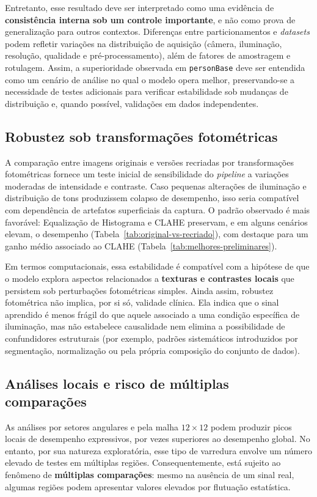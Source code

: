 \documentclass[12pt,a4paper]{article}
\begin{document}
Entretanto, esse resultado deve ser interpretado como uma evidência de
\textbf{consistência interna sob um controle importante}, e não como prova de
generalização para outros contextos. Diferenças entre particionamentos e
\textit{datasets} podem refletir variações na distribuição de aquisição (câmera,
iluminação, resolução, qualidade e pré-processamento), além de fatores de
amostragem e rotulagem. Assim, a superioridade observada em \texttt{personBase}
deve ser entendida como um cenário de análise no qual o modelo opera melhor,
preservando-se a necessidade de testes adicionais para verificar estabilidade
sob mudanças de distribuição e, quando possível, validações em dados independentes.

\subsection{Robustez sob transformações fotométricas}
A comparação entre imagens originais e versões recriadas por transformações
fotométricas fornece um teste inicial de sensibilidade do \textit{pipeline} a
variações moderadas de intensidade e contraste. Caso pequenas alterações de
iluminação e distribuição de tons produzissem colapso de desempenho, isso seria
compatível com dependência de artefatos superficiais da captura. O padrão
observado é mais favorável: Equalização de Histograma e CLAHE preservam, e em
alguns cenários elevam, o desempenho (Tabela~\ref{tab:original-vs-recriado}),
com destaque para um ganho médio associado ao CLAHE
(Tabela~\ref{tab:melhores-preliminares}).

Em termos computacionais, essa estabilidade é compatível com a hipótese de que o
modelo explora aspectos relacionados a \textbf{texturas e contrastes locais} que
persistem sob perturbações fotométricas simples. Ainda assim, robustez
fotométrica não implica, por si só, validade clínica. Ela indica que o sinal
aprendido é menos frágil do que aquele associado a uma condição específica de
iluminação, mas não estabelece causalidade nem elimina a possibilidade de
confundidores estruturais (por exemplo, padrões sistemáticos introduzidos por
segmentação, normalização ou pela própria composição do conjunto de dados).

\subsection{Análises locais e risco de múltiplas comparações}
As análises por setores angulares e pela malha \(12\times 12\) podem produzir picos
locais de desempenho expressivos, por vezes superiores ao desempenho global. No
entanto, por sua natureza exploratória, esse tipo de varredura envolve um número
elevado de testes em múltiplas regiões. Consequentemente, está sujeito ao fenômeno
de \textbf{múltiplas comparações}: mesmo na ausência de um sinal real, algumas
regiões podem apresentar valores elevados por flutuação estatística.
\end{document}
